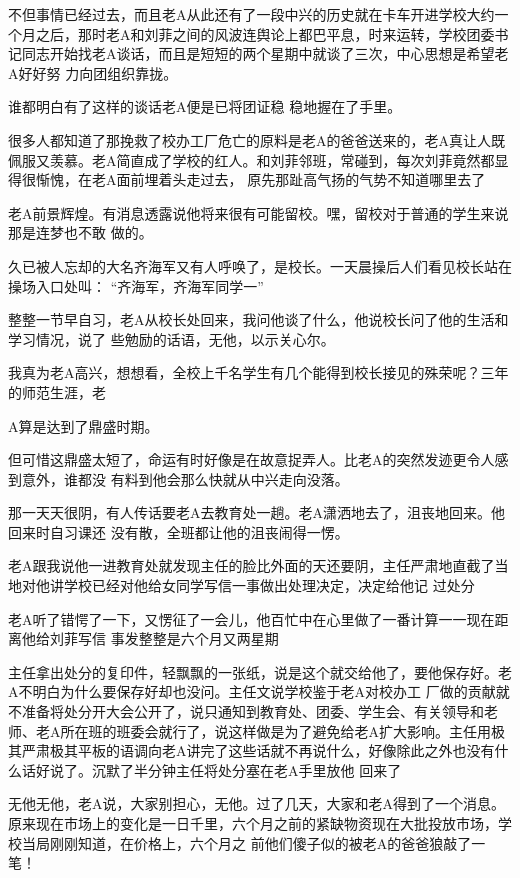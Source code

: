 \documentclass{article}
\begin{document}
不但事情已经过去，而且老A从此还有了一段中兴的历史就在卡车开进学校大约一个月之后，那时老A和刘菲之间的风波连舆论上都巴平息，时来运转，学校团委书记同志开始找老A谈话，而且是短短的两个星期中就谈了三次，中心思想是希望老A好好努
力向团组织靠拢。 

谁都明白有了这样的谈话老A便是已将团证稳
稳地握在了手里。 

\newpage

很多人都知道了那挽救了校办工厂危亡的原料是老A的爸爸送来的，老A真让人既佩服又羡慕。老A简直成了学校的红人。和刘菲邻班，常碰到，每次刘菲竟然都显得很惭愧，在老A面前埋着头走过去，
原先那趾高气扬的气势不知道哪里去了 

老A前景辉煌。有消息透露说他将来很有可能留校。嘿，留校对于普通的学生来说那是连梦也不敢
做的。 

久已被人忘却的大名齐海军又有人呼唤了，是校长。一天晨操后人们看见校长站在操场入口处叫：
“齐海军，齐海军同学一” 

整整一节早自习，老A从校长处回来，我问他谈了什么，他说校长问了他的生活和学习情况，说了
些勉励的话语，无他，以示关心尔。 

我真为老A高兴，想想看，全校上千名学生有几个能得到校长接见的殊荣呢？三年的师范生涯，老

\newpage
A算是达到了鼎盛时期。 

但可惜这鼎盛太短了，命运有时好像是在故意捉弄人。比老A的突然发迹更令人感到意外，谁都没
有料到他会那么快就从中兴走向没落。 

那一天天很阴，有人传话要老A去教育处一趟。老A潇洒地去了，沮丧地回来。他回来时自习课还
没有散，全班都让他的沮丧闹得一愣。 

老A跟我说他一进教育处就发现主任的脸比外面的天还要阴，主任严肃地直截了当地对他讲学校已经对他给女同学写信一事做出处理决定，决定给他记
过处分 

老A听了错愕了一下，又愣征了一会儿，他百忙中在心里做了一番计算一一现在距离他给刘菲写信
事发整整是六个月又两星期 

主任拿出处分的复印件，轻飘飘的一张纸，说是这个就交给他了，要他保存好。老A不明白为什么要保存好却也没问。主任文说学校鉴于老A对校办工
\newpage
厂做的贡献就不准备将处分开大会公开了，说只通知到教育处、团委、学生会、有关领导和老师、老A所在班的班委会就行了，说这样做是为了避免给老A扩大影响。主任用极其严肃极其平板的语调向老A讲完了这些话就不再说什么，好像除此之外也没有什么话好说了。沉默了半分钟主任将处分塞在老A手里放他
回来了 

无他无他，老A说，大家别担心，无他。过了几天，大家和老A得到了一个消息。原来现在市场上的变化是一日千里，六个月之前的紧缺物资现在大批投放市场，学校当局刚刚知道，在价格上，六个月之
前他们傻子似的被老A的爸爸狼敲了一笔！ 
\end{document}
